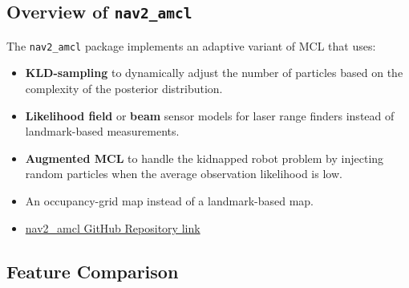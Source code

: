 \documentclass[12pt, a4paper]{article}
\begin{document}
\subsection{Overview of \texttt{nav2\_amcl}}
The \texttt{nav2\_amcl} package implements an adaptive variant of MCL that uses:
\begin{itemize}[nosep]
  \item \textbf{KLD-sampling} to dynamically adjust the number of particles based on the complexity of the posterior distribution.
  \item \textbf{Likelihood field} or \textbf{beam} sensor models for laser range finders instead of landmark-based measurements.
  \item \textbf{Augmented MCL} to handle the kidnapped robot problem by injecting random particles when the average observation likelihood is low.
  \item An occupancy-grid map instead of a landmark-based map.
  \item \href{https://github.com/ros-planning/navigation2/tree/humble/nav2_amcl}{nav2\_amcl GitHub Repository link}
\end{itemize}

\subsection{Feature Comparison}

\begin{table}[H]
\centering
\caption{Feature comparison between our implementation and \texttt{nav2\_amcl}.}
\label{tab:comparison}
\small
{}
\end{table}
\end{document}
